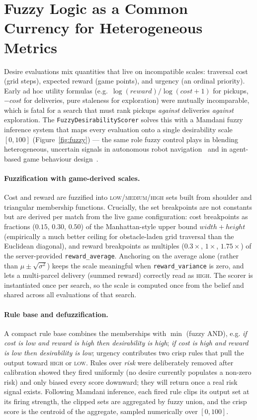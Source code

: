 \section{Fuzzy Logic as a Common Currency for Heterogeneous Metrics}
\label{sec:fuzzy}

Desire evaluations mix quantities that live on incompatible scales: traversal cost (grid steps),
expected reward (game points), and urgency (an ordinal priority). Early ad hoc utility formulas
(e.g.\ $\log(\mathit{reward})/\log(\mathit{cost}+1)$ for pickups, $-\mathit{cost}$ for
deliveries, pure staleness for exploration) were mutually incomparable, which is fatal for a
search that must rank pickups \emph{against} deliveries \emph{against} exploration. The
\texttt{FuzzyDesirabilityScorer} solves this with a Mamdani fuzzy inference system that maps
every evaluation onto a single desirability scale $[0,100]$ (Figure~\ref{fig:fuzzy}) --- the same
role fuzzy control plays in blending heterogeneous, uncertain signals in autonomous robot
navigation~\cite{saffiotti1997} and in agent-based game behaviour design~\cite{li2004fuzzy}.

\paragraph{Fuzzification with game-derived scales.} Cost and reward are fuzzified into
\textsc{low}/\textsc{medium}/\textsc{high} sets built from shoulder and triangular membership
functions. Crucially, the set breakpoints are not constants but are derived per match from the
live game configuration: cost breakpoints as fractions ($0.15$, $0.30$, $0.50$) of the
Manhattan-style upper bound $\mathit{width}+\mathit{height}$ (empirically a much better ceiling
for obstacle-laden grid traversal than the Euclidean diagonal), and reward breakpoints as
multiples ($0.3\times$, $1\times$, $1.75\times$) of the server-provided
\texttt{reward\_average}. Anchoring on the average alone (rather than
$\mu \pm \sqrt{\sigma^2}$) keeps the scale meaningful when \texttt{reward\_variance} is zero,
and lets a multi-parcel delivery (summed reward) correctly read as \textsc{high}. The scorer is
instantiated once per search, so the scale is computed once from the belief and shared across
all evaluations of that search.

\paragraph{Rule base and defuzzification.} A compact rule base combines the memberships with
$\min$ (fuzzy AND), e.g.
\emph{if cost is low and reward is high then desirability is high};
\emph{if cost is high and reward is low then desirability is low};
urgency contributes two crisp rules that pull the output toward \textsc{high} or \textsc{low}.
Rules over \emph{risk} were deliberately removed after calibration showed they fired uniformly
(no desire currently populates a non-zero risk) and only biased every score downward; they will
return once a real risk signal exists. Following Mamdani inference, each fired rule clips its
output set at its firing strength, the clipped sets are aggregated by fuzzy union, and the crisp
score is the centroid of the aggregate, sampled numerically over $[0,100]$.

